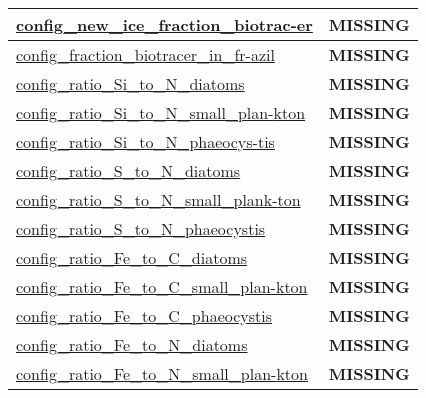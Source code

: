 {\begin{center}
\begin{longtable}{| p{2.0in} || p{4.0in} |}
    \hline
    \hyperref[subsec:nm_sec_config_new_ice_fraction_biotracer]{config\_new\_ice\_fraction\_biotrac-}\hyperref[subsec:nm_sec_config_new_ice_fraction_biotracer]{er}& {\bf \color{red} MISSING} \\
    \hline
    \hyperref[subsec:nm_sec_config_fraction_biotracer_in_frazil]{config\_fraction\_biotracer\_in\_fr-}\hyperref[subsec:nm_sec_config_fraction_biotracer_in_frazil]{azil}& {\bf \color{red} MISSING} \\
    \hline
    \hyperref[subsec:nm_sec_config_ratio_Si_to_N_diatoms]{config\_ratio\_Si\_to\_N\_diatoms} & {\bf \color{red} MISSING} \\
    \hline
    \hyperref[subsec:nm_sec_config_ratio_Si_to_N_small_plankton]{config\_ratio\_Si\_to\_N\_small\_plan-}\hyperref[subsec:nm_sec_config_ratio_Si_to_N_small_plankton]{kton}& {\bf \color{red} MISSING} \\
    \hline
    \hyperref[subsec:nm_sec_config_ratio_Si_to_N_phaeocystis]{config\_ratio\_Si\_to\_N\_phaeocys-}\hyperref[subsec:nm_sec_config_ratio_Si_to_N_phaeocystis]{tis}& {\bf \color{red} MISSING} \\
    \hline
    \hyperref[subsec:nm_sec_config_ratio_S_to_N_diatoms]{config\_ratio\_S\_to\_N\_diatoms} & {\bf \color{red} MISSING} \\
    \hline
    \hyperref[subsec:nm_sec_config_ratio_S_to_N_small_plankton]{config\_ratio\_S\_to\_N\_small\_plank-}\hyperref[subsec:nm_sec_config_ratio_S_to_N_small_plankton]{ton}& {\bf \color{red} MISSING} \\
    \hline
    \hyperref[subsec:nm_sec_config_ratio_S_to_N_phaeocystis]{config\_ratio\_S\_to\_N\_phaeocystis} & {\bf \color{red} MISSING} \\
    \hline
    \hyperref[subsec:nm_sec_config_ratio_Fe_to_C_diatoms]{config\_ratio\_Fe\_to\_C\_diatoms} & {\bf \color{red} MISSING} \\
    \hline
    \hyperref[subsec:nm_sec_config_ratio_Fe_to_C_small_plankton]{config\_ratio\_Fe\_to\_C\_small\_plan-}\hyperref[subsec:nm_sec_config_ratio_Fe_to_C_small_plankton]{kton}& {\bf \color{red} MISSING} \\
    \hline
    \hyperref[subsec:nm_sec_config_ratio_Fe_to_C_phaeocystis]{config\_ratio\_Fe\_to\_C\_phaeocystis} & {\bf \color{red} MISSING} \\
    \hline
    \hyperref[subsec:nm_sec_config_ratio_Fe_to_N_diatoms]{config\_ratio\_Fe\_to\_N\_diatoms} & {\bf \color{red} MISSING} \\
    \hline
    \hyperref[subsec:nm_sec_config_ratio_Fe_to_N_small_plankton]{config\_ratio\_Fe\_to\_N\_small\_plan-}\hyperref[subsec:nm_sec_config_ratio_Fe_to_N_small_plankton]{kton}& {\bf \color{red} MISSING} \\

\end{longtable}
\end{center}}
